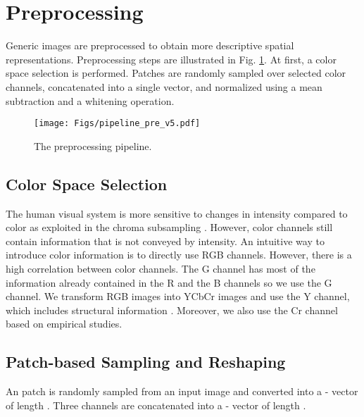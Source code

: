 \documentclass[draftcls,12pt, onecolumn]{IEEEtran}
\begin{document}
 \vspace{-2.5mm}
\section{Preprocessing}
\vspace{-1.0mm}
Generic images are preprocessed to obtain more descriptive spatial representations. Preprocessing steps are illustrated in Fig. \ref{fig:pre}. At first, a color space selection is performed. Patches are randomly sampled over selected color channels, concatenated into a single vector, and normalized using a mean subtraction and a whitening operation. 
\vspace{-2.0mm}
\begin{figure}[htbp!]
\begin{center}
\noindent
  \texttt{[image: Figs/pipeline\_pre\_v5.pdf]}
	\vspace{-1.5mm}
    \caption{The preprocessing pipeline.}
  \label{fig:pre}
\end{center}
\vspace{-10.0mm}
\end{figure}
\subsection{Color Space Selection}
The human visual system is more sensitive to changes in intensity compared to color as exploited in the chroma subsampling \cite{lamb2001}. However, color channels still contain  information that is not conveyed by intensity. An intuitive way to introduce color information is to directly use RGB channels. However, there is a high correlation between color channels. The G channel has most of the information already contained in the R and the B channels \cite{tkalcic2003colour} so we use the G channel. We transform RGB images into YCbCr images and use the Y channel, which includes structural information \cite{wang2004image}. Moreover, we also use the Cr channel based on empirical studies.
\vspace{-4.5mm}
\subsection{Patch-based Sampling and Reshaping}
\vspace{-1.0mm}
An  patch is randomly sampled from an input image and converted into a - vector of length . Three channels are concatenated into a - vector of length . 
\vspace{-4.5mm}
\end{document}
